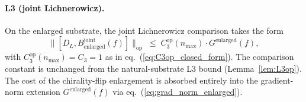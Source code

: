 \documentclass[11pt,a4paper]{article}
\theoremstyle{plain}
\theoremstyle{definition}
\newcommand{\nmax}{n_{\max}}
\newcommand{\opnorm}[1]{\lVert #1 \rVert_{\mathrm{op}}}
\newcommand{\DL}{D_{L}}
\newcommand{\Bjoint}{B^{\mathrm{joint}}}
\newcommand{\Cthreeop}{C_{3}^{\mathrm{op}}}
\begin{document}
\paragraph{L3 (joint Lichnerowicz).}
On the enlarged substrate, the joint Lichnerowicz comparison takes the
form
\begin{equation}\label{eq:L3_enlarged_main}
   \opnorm{[\DL, \Bjoint_{\mathrm{enlarged}}(f)]}
   \;\le\; \Cthreeop(\nmax) \cdot G^{\mathrm{enlarged}}(f),
\end{equation}
with $\Cthreeop(\nmax) = C_{3} = 1$ as in eq.~(\ref{eq:C3op_closed_form}).
The comparison constant is unchanged from the natural-substrate L3
bound (Lemma~\ref{lem:L3op}). The cost of the chirality-flip
enlargement is absorbed entirely into the gradient-norm extension
$G^{\mathrm{enlarged}}(f)$ via eq.~(\ref{eq:grad_norm_enlarged}).
\end{document}
